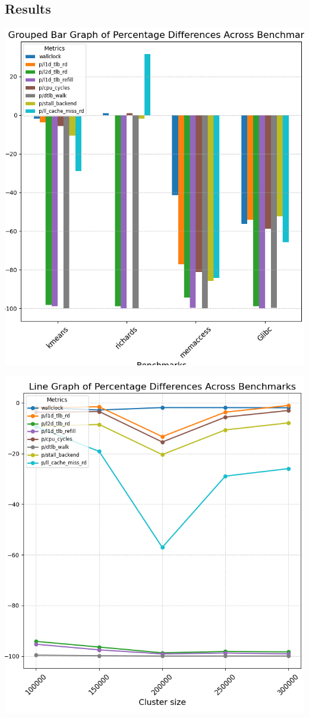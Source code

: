 \documentclass[11pt]{article}
\begin{document}
\subsection{Results}
\label{sec:org4bdc0d9}
\begin{center}
\includegraphics[width=.9\linewidth]{./diagrams/allbenchmarks.png}
\end{center}

\begin{center}
\includegraphics[width=.9\linewidth]{./diagrams/kmeans.png}
\end{center}
\end{document}
